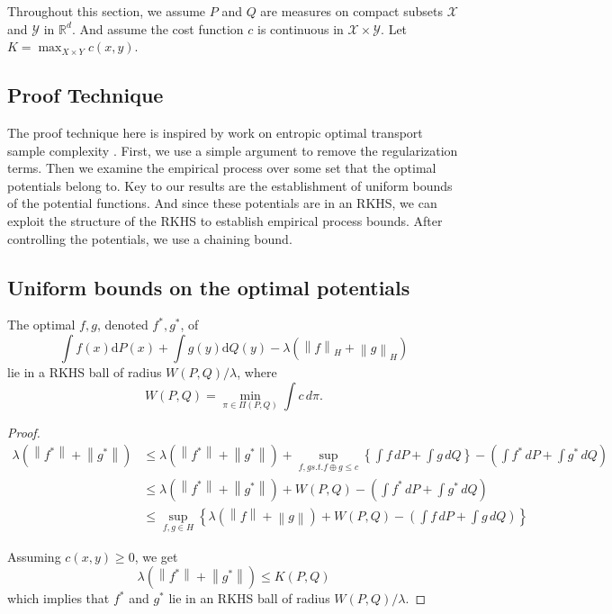 	
	Throughout this section, we assume $P$ and $Q$ are measures on compact subsets $\mathcal{X}$ and $\mathcal{Y}$ in $\mathbb{R}^d$. And assume the cost function $c$ is continuous in $\mathcal{X}\times \mathcal{Y}$. Let $K=\max_{X\times Y}c(x,y)$.
	
	\subsection*{Proof Technique}
	 The proof technique here is inspired by work on entropic optimal transport sample complexity \cite{Mena2019}. First, we use a simple argument to remove the regularization terms. Then we examine the empirical process over some set that the optimal potentials belong to. Key to our results are the establishment of uniform bounds of the potential functions. And since these potentials are in an RKHS, we can exploit the structure of the RKHS to establish empirical process bounds. After controlling the potentials, we use a chaining bound.
	
	\subsection*{Uniform bounds on the optimal potentials}
	\begin{prop}
		The optimal $f,g$, denoted $f^*,g^*$, of $$\int f(x)\mathrm{d}P(x)+\int g(y)\mathrm{d}Q(y)-\lambda(\left\|f\right\|_H+\left\|g\right\|_H)$$ lie in a RKHS ball of radius $W(P,Q)/\lambda$, where 
		$$
		W(P,Q)=\min_{\pi\in \Pi(P,Q)} \int c\,d\pi.
		$$
	\end{prop}
	\begin{proof}
		\begin{align*}
			\lambda (\left\|f^*\right\|+\left\|g^*\right\|)&\leq \lambda (\left\|f^*\right\|+\left\|g^*\right\|) + \sup_{f,g s.t. f\oplus g\leq c} \left\{\int f\,dP + \int g\,dQ \right\} - \left(\int f^{*}\,dP + \int g^{*}\,dQ\right) \\
			&\leq \lambda (\left\|f^*\right\|+\left\|g^*\right\|) + W(P,Q) - \left(\int f^{*}\,dP + \int g^{*}\,dQ\right) \\
			&\leq \sup_{f,g\in H} \left\{\lambda (\left\|f\right\|+\left\|g\right\|) + W(P,Q) - \left(\int f\,dP + \int g\,dQ\right)\right\}
		\end{align*}
		
		Assuming $c(x,y)\geq 0$, we get $$\lambda(\left\|f^*\right\|+\left\|g^*\right\|)\leq K(P,Q)$$ which implies that $f^*$ and $g^*$ lie in an RKHS ball of radius $W(P,Q)/\lambda$.
	\end{proof}
	
